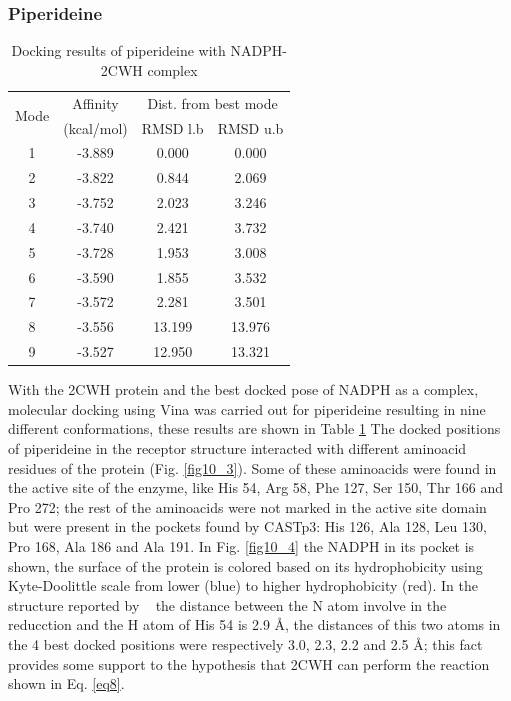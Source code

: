 \documentclass[12pt]{article}
\newcommand{\textcite}[1]{\citeauthor{#1}~\citeyear{#1}}
\begin{document}
	\newpage
	
	\subsubsection{Piperideine}
	
	\begin{table}
		\centering
		\caption{\centering Docking results of piperideine with NADPH-2CWH complex}
		\label{table10_2}
		\begin{tabular}{cccc}
			\toprule
			\multirow{2}{*}{Mode} & Affinity & \multicolumn{2}{c}{Dist. from best mode}\\
			&  (kcal/mol) & RMSD l.b & RMSD u.b\\
			\midrule
			1 & -3.889   &    0.000  &    0.000\\
			2 & -3.822   &   0.844   &   2.069\\
			3 &  -3.752  &    2.023  &    3.246\\
			4 & -3.740   &   2.421   &   3.732\\
			5 & -3.728   &   1.953   &   3.008\\
			6 &  -3.590  &    1.855  &    3.532\\
			7 & -3.572   &   2.281   &   3.501\\
			8 & -3.556   &   13.199  &   13.976\\
			9 & -3.527   &  12.950   &  13.321\\
			\bottomrule
			
		\end{tabular}
	\end{table}
	
	With the 2CWH protein and the best docked pose of NADPH as a complex, molecular docking using Vina was carried out for piperideine resulting in nine different conformations, these results are shown in Table \ref{table10_2} The docked positions of piperideine in the receptor structure interacted with different aminoacid residues of the protein (Fig. \ref{fig10_3}). Some of these aminoacids were found in the  active site of the enzyme, like His 54, Arg 58, Phe 127, Ser 150, Thr 166 and Pro 272; the rest of the aminoacids were not marked in the active site domain but were present in the pockets found by CASTp3: His 126, Ala 128, Leu 130, Pro 168, Ala 186 and Ala 191. In Fig. \ref{fig10_4} the NADPH in its pocket is shown, the surface of the protein is colored based on its hydrophobicity using Kyte-Doolittle scale from lower (blue) to higher hydrophobicity (red). In the structure reported by \textcite{goto2005crystal} the distance between the N atom involve in the reducction and the H atom of His 54 is 2.9 \r{A}, the distances of this two atoms in the 4 best docked positions were respectively 3.0, 2.3, 2.2 and 2.5 \r{A}; this fact provides some support to the hypothesis that 2CWH can perform the reaction shown in Eq. \ref{eq8}.
	
\end{document}
